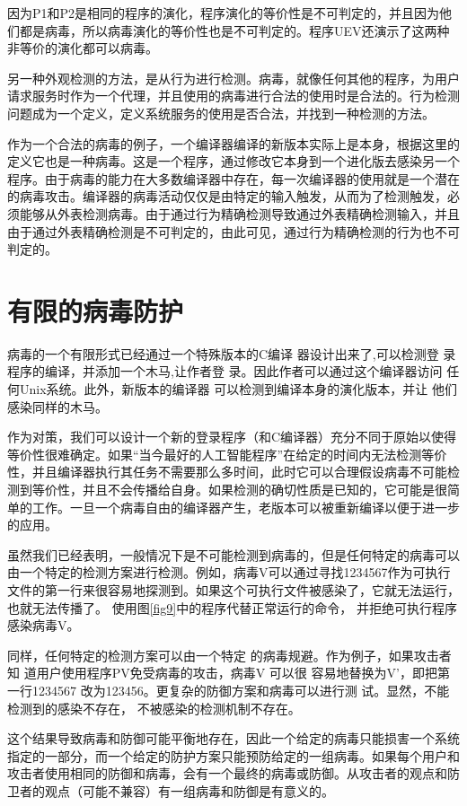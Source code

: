 因为P1和P2是相同的程序的演化，程序演化的等价性是不可判定的，并且因为他们都是病毒，所以病毒演化的等价性也是不可判定的。程序UEV还演示了这两种非等价的演化都可以病毒。

另一种外观检测的方法，是从行为进行检测。病毒，就像任何其他的程序，为用户请求服务时作为一个代理，并且使用的病毒进行合法的使用时是合法的。行为检测问题成为一个定义，定义系统服务的使用是否合法，并找到一种检测的方法。

作为一个合法的病毒的例子，一个编译器编译的新版本实际上是本身，根据这里的定义它也是一种病毒。这是一个程序，通过修改它本身到一个进化版去感染另一个程序。由于病毒的能力在大多数编译器中存在，每一次编译器的使用就是一个潜在的病毒攻击。编译器的病毒活动仅仅是由特定的输入触发，从而为了检测触发，必须能够从外表检测病毒。由于通过行为精确检测导致通过外表精确检测输入，并且由于通过外表精确检测是不可判定的，由此可见，通过行为精确检测的行为也不可判定的。

\section{有限的病毒防护}

病毒的一个有限形式已经通过一个特殊版本的C编译
器设计出来了,可以检测登
录程序的编译，并添加一个木马,让作者登
录。因此作者可以通过这个编译器访问
任何Unix系统。此外，新版本的编译器
可以检测到编译本身的演化版本，并让
他们感染同样的木马。


作为对策，我们可以设计一个新的登录程序（和C编译器）充分不同于原始以使得等价性很难确定。如果“当今最好的人工智能程序”在给定的时间内无法检测等价性，并且编译器执行其任务不需要那么多时间，此时它可以合理假设病毒不可能检测到等价性，并且不会传播给自身。如果检测的确切性质是已知的，它可能是很简单的工作。一旦一个病毒自由的编译器产生，老版本可以被重新编译以便于进一步的应用。



虽然我们已经表明，一般情况下是不可能检测到病毒的，但是任何特定的病毒可以由一个特定的检测方案进行检测。例如，病毒V可以通过寻找1234567作为可执行文件的第一行来很容易地探测到。如果这个可执行文件被感染了，它就无法运行，也就无法传播了。
使用图\ref{fig9}中的程序代替正常运行的命令，
并拒绝可执行程序感染病毒V。


同样，任何特定的检测方案可以由一个特定
的病毒规避。作为例子，如果攻击者知
道用户使用程序PV免受病毒的攻击，病毒V 可以很
容易地替换为V’，即把第一行1234567
改为123456。更复杂的防御方案和病毒可以进行测
试。显然，不能检测到的感染不存在，
不被感染的检测机制不存在。


这个结果导致病毒和防御可能平衡地存在，因此一个给定的病毒只能损害一个系统指定的一部分，而一个给定的防护方案只能预防给定的一组病毒。如果每个用户和攻击者使用相同的防御和病毒，会有一个最终的病毒或防御。从攻击者的观点和防卫者的观点（可能不兼容）有一组病毒和防御是有意义的。


